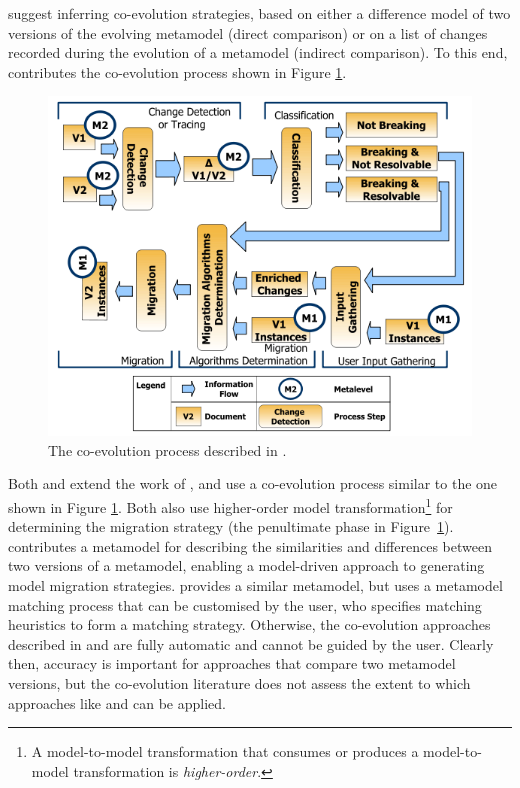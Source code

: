 \cite{gruschko07towards} suggest inferring co-evolution strategies, based on either a difference model of two versions of the evolving metamodel (direct comparison) or on a list of changes recorded during the evolution of a metamodel (indirect comparison). To this end, \cite{gruschko07towards} contributes the co-evolution process shown in Figure \ref{fig:coevoprocess}. 

\begin{figure}[htbp]
  \begin{center}
    \leavevmode
    \includegraphics[scale=0.6]{3.LiteratureReview/images/CoEvoProcess.png}
  \end{center}
  \caption[An exemplar co-evolution process]{The co-evolution process described in \cite{gruschko07towards}.}
  \label{fig:coevoprocess}
\end{figure}

Both \cite{cicchetti08automating} and \cite{garces09managing} extend the work of \cite{gruschko07towards}, and use a co-evolution process similar to the one shown in Figure \ref{fig:coevoprocess}. Both also use higher-order model transformation\footnote{A model-to-model transformation that consumes or produces a model-to-model transformation is \emph{higher-order}.} for determining the migration strategy (the penultimate phase in Figure~\ref{fig:coevoprocess}). \cite{cicchetti08automating} contributes a metamodel for  describing the similarities and differences between two versions of a metamodel, enabling a model-driven approach to generating model migration strategies. \cite{garces09managing} provides a similar metamodel, but uses a metamodel matching process that can be customised by the user, who specifies matching heuristics to form a matching strategy. Otherwise, the co-evolution approaches described in \cite{cicchetti08automating} and \cite{garces09managing} are fully automatic and cannot be guided by the user. Clearly then, accuracy is important for approaches that compare two metamodel versions, but the co-evolution literature does not assess the extent to which approaches like \cite{cicchetti08automating} and \cite{garces09managing} can be applied.

